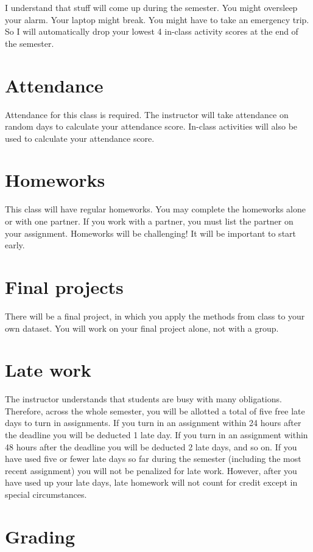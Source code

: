 \documentclass[10pt]{memoir}
\begin{document}
I understand that stuff will come up during the semester. You might oversleep your alarm. Your laptop might break. You might have to take an emergency trip. So I will automatically drop your lowest 4 in-class activity scores at the end of the semester.


\section{\textbf{Attendance}}
Attendance for this class is required. 
The instructor will take attendance on random days to calculate your attendance score.
In-class activities will also be used to calculate your attendance score.

\section{\textbf{Homeworks}}
This class will have regular homeworks. 
You may complete the homeworks alone or with one partner. 
If you work with a partner, you must list the partner on your assignment. 
Homeworks will be challenging! It will be important to start early.

\section{\textbf{Final projects}}
There will be a final project, in which you apply the methods from class to your own dataset.
You will work on your final project alone, not with a group.

\section{\textbf{Late work}}
The instructor understands that students are busy with many obligations. 
Therefore, across the whole semester, you will be allotted a total of five free late days to turn in assignments. 
If you turn in an assignment within 24 hours after the deadline you will be deducted 1 late day. 
If you turn in an assignment within 48 hours after the deadline you will be deducted 2 late days, and so on. 
If you have used five or fewer late days so far during the semester (including the most recent assignment) you will not be penalized for late work. 
However, after you have used up your late days, late homework will not count for credit except in special circumstances.

\section{\textbf{Grading}}
\end{document}
